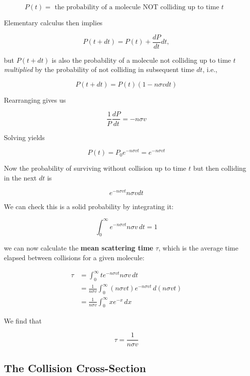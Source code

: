 \documentclass[svgnames]{article}     %
\begin{document}
\[
  P(t) = \text{ the probability of a molecule NOT colliding up to time $t$ }
\] \vspace{5px}

Elementary calculus then implies 

\[
P(t + dt) = P(t) + \frac{dP}{dt}dt, 
\] \vspace{5px}

but $P(t+dt)$ is also the probability of a molecule not colliding up to time
$t$ \textit{multiplied} by the probability of not colliding in subsequent time
$dt$, i.e.,

\[
P(t+dt) = P(t)(1-n\sigma v dt)
\] \vspace{5px}

Rearranging gives us 

\[
\frac{1}{P}\frac{dP}{dt} = -n\sigma v
\] \vspace{5px}

Solving yields 

\[
  P(t) = P_0  e^{-n\sigma vt} = e^{-n\sigma vt}
\] \vspace{5px}

Now the probability of surviving without collision up to time $t$ but then
colliding in the next $dt$ is 

\[
  e^{-n\sigma vt} n\sigma v dt
\] \vspace{5px}

We can check this is a solid probability by integrating it: 

\[
  \int_{0}^{\infty}  e^{-n\sigma vt} n\sigma  v \, dt = 1 
\] \vspace{5px}

we can now calculate the \textbf{mean scattering time} $\tau$, which is the
average time elapsed between collisions for a given molecule: 

\begin{align*}
  \tau &= \int_{0}^{\infty} te^{-n\sigma vt} n\sigma v \, dt\\
       &= \frac{1}{n\sigma v} \int_{0}^{\infty} (n\sigma vt) e^{-n\sigma vt} \,
       d(n\sigma vt) \\ 
       &= \frac{1}{n\sigma v}\int_{0}^{\infty} xe^{-x} \, dx
\end{align*}


We find that 

\[
\tau = \frac{1}{n\sigma v}
\] \vspace{5px}

\subsection{The Collision Cross-Section} 
\end{document}

